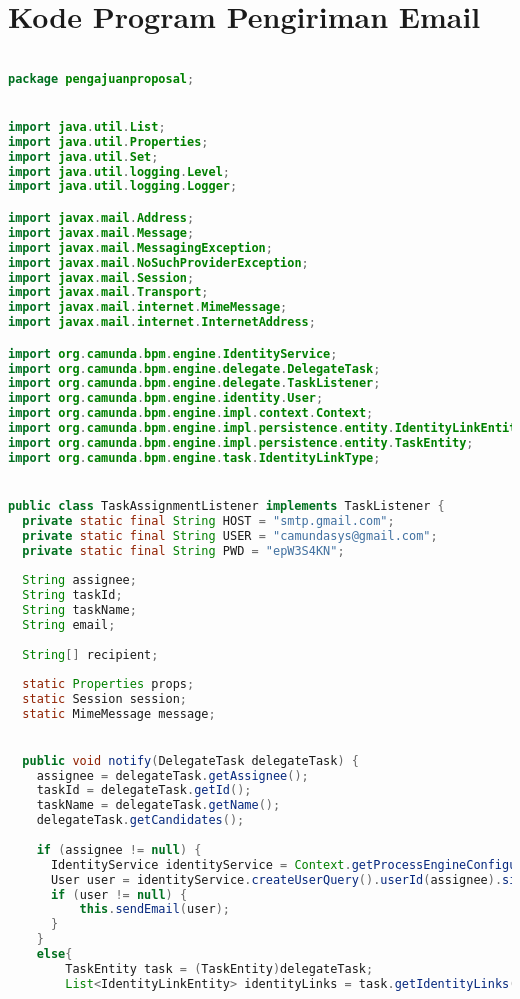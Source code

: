 \chapter{Kode Program Pengiriman Email}
\label{lamp:tasklistener}

\begin{lstlisting}[language=Java,basicstyle=\tiny,caption=TaskAssignmentListener.java]

package pengajuanproposal;


import java.util.List;
import java.util.Properties;
import java.util.Set;
import java.util.logging.Level;
import java.util.logging.Logger;

import javax.mail.Address;
import javax.mail.Message;
import javax.mail.MessagingException;
import javax.mail.NoSuchProviderException;
import javax.mail.Session;
import javax.mail.Transport;
import javax.mail.internet.MimeMessage;
import javax.mail.internet.InternetAddress;

import org.camunda.bpm.engine.IdentityService;
import org.camunda.bpm.engine.delegate.DelegateTask;
import org.camunda.bpm.engine.delegate.TaskListener;
import org.camunda.bpm.engine.identity.User;
import org.camunda.bpm.engine.impl.context.Context;
import org.camunda.bpm.engine.impl.persistence.entity.IdentityLinkEntity;
import org.camunda.bpm.engine.impl.persistence.entity.TaskEntity;
import org.camunda.bpm.engine.task.IdentityLinkType;


public class TaskAssignmentListener implements TaskListener {
  private static final String HOST = "smtp.gmail.com";
  private static final String USER = "camundasys@gmail.com";
  private static final String PWD = "epW3S4KN";
  
  String assignee;
  String taskId;
  String taskName;
  String email;
  
  String[] recipient;
  
  static Properties props;
  static Session session;
  static MimeMessage message;
  

  public void notify(DelegateTask delegateTask) {
    assignee = delegateTask.getAssignee();
    taskId = delegateTask.getId();
    taskName = delegateTask.getName();
    delegateTask.getCandidates();
    
    if (assignee != null) {
      IdentityService identityService = Context.getProcessEngineConfiguration().getIdentityService();
      User user = identityService.createUserQuery().userId(assignee).singleResult();
      if (user != null) {
    	  this.sendEmail(user);
      }
    }
    else{
    	TaskEntity task = (TaskEntity)delegateTask;
    	List<IdentityLinkEntity> identityLinks = task.getIdentityLinks();
    	

\end{lstlisting}
